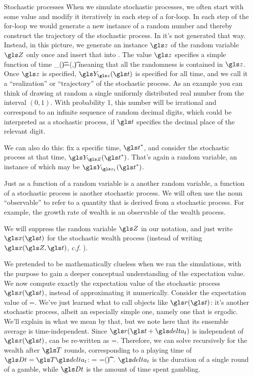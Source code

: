 \begin{excursion}{Stochastic processes}
When we simulate stochastic processes, we often start with some value and modify it iteratively in each step of a for-loop. In each step of the for-loop we would generate a new instance of a random number and thereby construct the trajectory of the stochastic process. In  it's not generated that way. Instead, in this picture, we generate an instance $\z$ of the random variable $\Z$ only once and insert that into . The value $\z$ specifies a simple function of time
\be
\Y_{\z}(\t)=\gf(\z,\t)
\ee
meaning that all the randomness is contained in $\z$. Once $\z$ is specified, $\Y_{\z}(\t)$ is specified for all time, and we call it a ``realization'' or ``trajectory'' of the stochastic process. As an example you can think of drawing  at random a single uniformly distributed real number from the interval $(0,1)$. With probability 1, this number will be irrational and correspond to an infinite sequence of random decimal digits, which could be interpreted as a stochastic process, if $\t$ specifies the decimal place of the relevant digit.

We can also do this: fix a specific time, $\t^*$, and consider the stochastic process at that time, $\Y_{\Z}(\t^*)$. That's again a random variable, an instance of which may be $\Y_{\z_1}(\t^*)$.

Just as a function of a random variable is a another random variable, a function of a stochastic process is another stochastic process. We will often use the noun ``observable'' to refer to a quantity that is derived from a stochastic process. For example, the growth rate of wealth is an observable of the wealth process.

We will suppress the random variable $\Z$ in our notation, and just write $\x(\t)$ for the stochastic wealth process (instead of writing $\x(\Z,\t)$, {\it c.f.} ).
\end{excursion}

We pretended to be mathematically clueless when we ran the simulations,
with the purpose to gain a deeper conceptual understanding of the expectation 
value. We now compute exactly the expectation value of the stochastic process $\x(\t)$, instead of 
approximating it numerically. Consider the expectation value of   
\be
\ave{\x(\t+\dt)}=\ave{\x(\t)\gr(\t+\dt)}.
\ee
We've just learned what to call objects like $\gr(\t)$: it's another stochastic process, albeit an especially simple one, namely one that is ergodic. We'll explain in  what we mean by that, but we note here that its ensemble average is time-independent.
Since $\gr(\t+\dt)$ is independent of $\x(\t)$,  can be re-written as
\be
\ave{\x(\t+\dt)}=\ave{\x(\t)}\ave{\gr}.
\ee
Therefore, we can solve recursively for the wealth after $\T$ rounds, corresponding to a playing time of $\Dt=\T\dt$:
\be
\ave{\x(\t+\Dt)} = \ave{\x(\t+\T\dt)}=\x(\t)\ave{\gr}^\T.
\ee
$\dt$ is the duration of a single round of a gamble, while $\Dt$ is the amount of time spent gambling.

